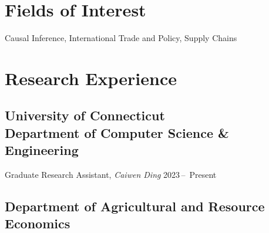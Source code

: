 \documentclass[10.5 pt,letterpaper]{article}
\renewenvironment{itemize}{
	\begin{list}{}{
			\setlength{\leftmargin}{1.5em}
		}
	}{
	\end{list}
}
\begin{document}
\begin{itemize}
		
		
	\end{itemize}
	
	\section*{\textbf{Fields of Interest}}
	
	Causal Inference, International Trade and Policy,  Supply Chains 
	
	\section*{\textbf{Research     Experience}}
	
		\subsection*{University of Connecticut  \vspace{0.2 cm} \\  
			Department of Computer Science \& Engineering}
			\begin{itemize}
			\item[-] Graduate Research Assistant, \textit{Caiwen Ding}	\hfill    2023\,--\,  Present
		\end{itemize}
	\subsection*{Department of Agricultural and Resource Economics}
	
\end{document}
